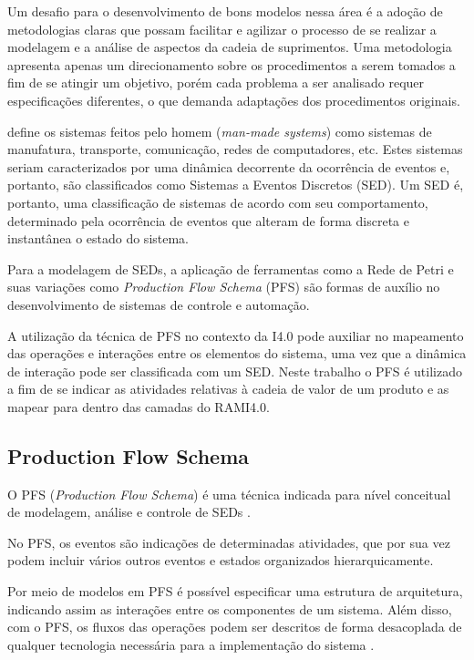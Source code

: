 Um desafio para o desenvolvimento de bons modelos nessa área é a adoção de metodologias claras que possam facilitar e agilizar o processo de se realizar a modelagem e a análise de aspectos da cadeia de suprimentos. Uma metodologia apresenta apenas um direcionamento sobre os procedimentos a serem tomados a fim de se atingir um objetivo, porém cada problema a ser analisado requer especificações diferentes, o que demanda adaptações dos procedimentos originais.

 define os sistemas feitos pelo homem (\textit{man-made systems}) como sistemas de manufatura, transporte, comunicação, redes de computadores, etc. Estes sistemas seriam caracterizados por uma dinâmica decorrente da ocorrência de eventos e, portanto, são classificados como Sistemas a Eventos Discretos (SED). Um SED é, portanto, uma classificação de sistemas de acordo com seu comportamento, determinado pela ocorrência de eventos que alteram de forma discreta e instantânea o estado do sistema.

Para a modelagem de SEDs, a aplicação de ferramentas como a Rede de Petri e suas variações como \textit{Production Flow Schema} (PFS) são formas de auxílio no desenvolvimento de sistemas de controle e automação.

A utilização da técnica de PFS no contexto da I4.0 pode auxiliar no mapeamento das operações e interações entre os elementos do sistema, uma vez que a dinâmica de interação pode ser classificada com um SED. Neste trabalho o PFS é utilizado a fim de se indicar as atividades relativas à cadeia de valor de um produto e as mapear para dentro das camadas do RAMI4.0.

\subsection{Production Flow Schema}

O PFS (\textit{Production Flow Schema}) é uma técnica indicada para nível conceitual de modelagem, análise e controle de SEDs \cite{miyagi1996controle}.

No PFS, os eventos são indicações de determinadas atividades, que por sua vez podem incluir vários outros eventos e estados organizados hierarquicamente.

Por meio de modelos em PFS é possível especificar uma estrutura de arquitetura, indicando assim as interações entre os componentes de um sistema. Além disso, com o PFS, os fluxos das operações podem ser descritos de forma desacoplada de qualquer tecnologia necessária para a implementação do sistema \cite{pisching2018equipmentrami}.


